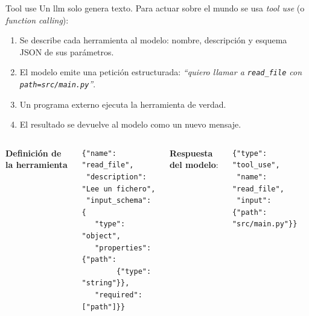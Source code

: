 \begin{frame}[fragile]{Tool use}
Un \gls{llm} \alert{solo genera texto}. Para actuar sobre el mundo se usa \alert{\textit{tool use}} (o \textit{function calling}):
 
\begin{enumerate}
    \item Se describe cada herramienta al modelo: \alert{nombre, descripción y esquema JSON} de sus parámetros.
    \item El modelo emite una \alert{petición estructurada}: \textit{``quiero llamar a \texttt{read\_file} con \texttt{path=src/main.py}''}.
    \item Un programa externo \alert{ejecuta} la herramienta de verdad.
    \item El resultado se devuelve al modelo como un nuevo mensaje.
\end{enumerate}

\begin{columns}

\textbf{Definición de la herramienta}
\vspace{-2em}
\begin{block}{}
\setlength{\abovedisplayskip}{2pt}
\setlength{\belowdisplayskip}{2pt}
\scriptsize
\begin{verbatim}
{"name": "read_file",
 "description": "Lee un fichero",
 "input_schema": {
   "type": "object",
   "properties": {"path":
        {"type": "string"}},
   "required": ["path"]}}
\end{verbatim}
\end{block}

\textbf{Respuesta del modelo}:
\vspace{-2em}
\begin{block}{}
\scriptsize
\begin{verbatim}
{"type": "tool_use",
 "name": "read_file",
 "input": {"path": "src/main.py"}}
\end{verbatim}
\end{block}
\end{columns}
\end{frame}

